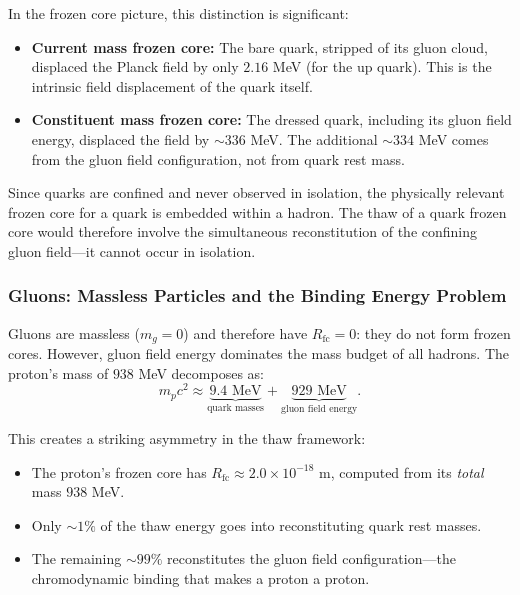 \documentclass[11pt,a4paper]{article}
\newcommand{\Rfc}{\ensuremath{R_{\mathrm{fc}}}}
\theoremstyle{definition}
\theoremstyle{remark}
\begin{document}
\vspace{0.5em}
\noindent
In the frozen core picture, this distinction is significant:
\begin{itemize}[leftmargin=*, itemsep=0.3em]
\item \textbf{Current mass frozen core:} The bare quark, stripped of its gluon cloud, displaced the Planck field by only $2.16$ MeV (for the up quark). This is the intrinsic field displacement of the quark itself.
\item \textbf{Constituent mass frozen core:} The dressed quark, including its gluon field energy, displaced the field by $\sim 336$ MeV. The additional $\sim 334$ MeV comes from the gluon field configuration, not from quark rest mass.
\end{itemize}

Since quarks are confined and never observed in isolation, the physically relevant frozen core for a quark is embedded within a hadron. The thaw of a quark frozen core would therefore involve the simultaneous reconstitution of the confining gluon field---it cannot occur in isolation.

\subsubsection{Gluons: Massless Particles and the Binding Energy Problem}
\label{sec:gluon_thaw}

Gluons are massless ($m_g = 0$) and therefore have $\Rfc = 0$: they do not form frozen cores. However, gluon field energy dominates the mass budget of all hadrons. The proton's mass of $938$ MeV decomposes as:
\begin{equation}
m_p c^2 \approx \underbrace{9.4 \text{ MeV}}_{\text{quark masses}} + \underbrace{929 \text{ MeV}}_{\text{gluon field energy}}.
\end{equation}

This creates a striking asymmetry in the thaw framework:
\begin{itemize}[leftmargin=*, itemsep=0.3em]
\item The proton's frozen core has $\Rfc \approx 2.0 \times 10^{-18}$ m, computed from its \emph{total} mass $938$ MeV.
\item Only $\sim 1\%$ of the thaw energy goes into reconstituting quark rest masses.
\item The remaining $\sim 99\%$ reconstitutes the gluon field configuration---the chromodynamic binding that makes a proton a proton.
\end{itemize}
\end{document}
